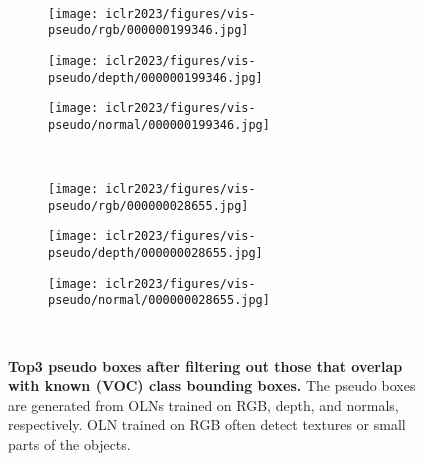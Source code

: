 \documentclass{article} \usepackage{iclr2023_conference,times}
\begin{document}
\begin{figure}
\begin{subfigure}[b]{0.32\textwidth}
\label{fig:y equals x}
     \end{subfigure}
     \\
     \begin{subfigure}[b]{0.32\textwidth}
         \centering
         \texttt{[image: iclr2023/figures/vis-pseudo/rgb/000000199346.jpg]}
\label{fig:three sin x}
     \end{subfigure}
     \begin{subfigure}[b]{0.32\textwidth}
         \centering
         \texttt{[image: iclr2023/figures/vis-pseudo/depth/000000199346.jpg]}
\label{fig:five over x}
     \end{subfigure} 
     \begin{subfigure}[b]{0.32\textwidth}
         \centering
         \texttt{[image: iclr2023/figures/vis-pseudo/normal/000000199346.jpg]}
\label{fig:y equals x}
     \end{subfigure}
     \\
     \begin{subfigure}[b]{0.32\textwidth}
         \centering
         \texttt{[image: iclr2023/figures/vis-pseudo/rgb/000000028655.jpg]}
\label{fig:three sin x}
     \end{subfigure}
     \begin{subfigure}[b]{0.32\textwidth}
         \centering
         \texttt{[image: iclr2023/figures/vis-pseudo/depth/000000028655.jpg]}
\label{fig:five over x}
     \end{subfigure} 
     \begin{subfigure}[b]{0.32\textwidth}
         \centering
         \texttt{[image: iclr2023/figures/vis-pseudo/normal/000000028655.jpg]}
\label{fig:y equals x}
     \end{subfigure}
     \\
    \caption{\textbf{Top3 pseudo boxes after filtering out those that overlap with known (VOC) class bounding boxes.} The pseudo boxes are generated from OLNs trained on RGB, depth, and normals, respectively.
OLN trained on RGB often detect textures or small parts of the objects.}
        \label{fig:pseudo-2}
\end{figure}
\end{document}
